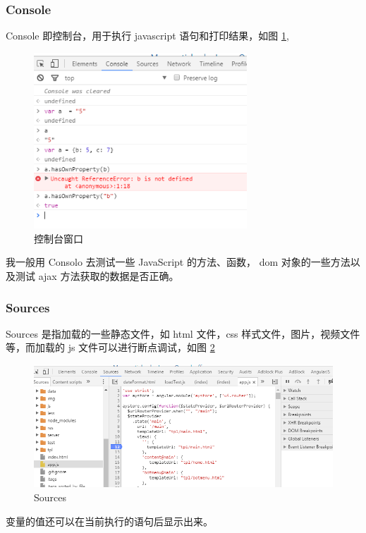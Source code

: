             \subsubsection{Console}
              \label{subsubsec:console}
                Console 即控制台，用于执行 javascript 语句和打印结果，如图 \ref{fig:cr_console},
                \begin{figure}[htbp]
                  \centering
                  \includegraphics[width=8cm]{./img/cr_console.png}
                  \caption{控制台窗口}
                  \label{fig:cr_console}
                \end{figure}
                我一般用 Consolo 去测试一些 JavaScript 的方法、函数， dom 对象的一些方法以及测试 ajax 方法获取的数据是否正确。

            \subsubsection{Sources}
              \label{subsubsec:sources}
                Sources 是指加载的一些静态文件，如 html 文件，css 样式文件，图片，视频文件等，而加载的 js 文件可以进行断点调试，如图 \ref{fig:cr_sources}
                \begin{figure}[htbp]
                  \centering
                  \includegraphics[width=12cm]{./img/cr_sources.png}
                  \caption{Sources}
                  \label{fig:cr_sources}
                \end{figure}
                变量的值还可以在当前执行的语句后显示出来。

